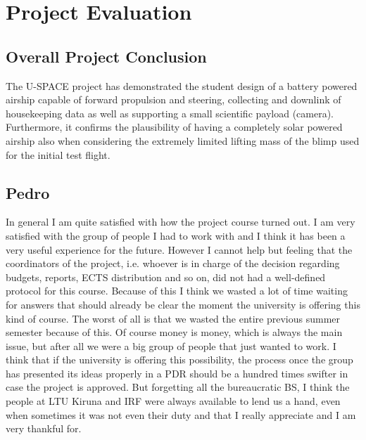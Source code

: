 \newpage
\chapter{Project Evaluation}
\label{chap:evaluation}

\section{Overall Project Conclusion}
%
The U-SPACE project has demonstrated the student design of a battery powered airship capable of forward propulsion and steering, collecting and downlink of housekeeping data as well as supporting a small scientific payload (camera). Furthermore, it confirms the plausibility of having a completely solar powered airship also when considering the extremely limited lifting mass of the blimp used for the initial test flight.
%
%
\section{Pedro}
In general I am quite satisfied with how the project course turned out. I am very satisfied with the group of people I had to work with and I think it has been a very useful experience for the future. 
However I cannot help but feeling that the coordinators of the project, i.e. whoever is in charge of the decision regarding budgets, reports, ECTS distribution and so on, did not had a well-defined protocol for this course. Because of this I think we wasted a lot of time waiting for answers that should already be clear the moment the university is offering this kind of course. The worst of all is that we wasted the entire previous summer semester because of this. Of course money is money, which is always the main issue, but after all we were a big group of people that just wanted to work. I think that if the university is offering this possibility, the process once the group has presented its ideas properly in a PDR should be a hundred times swifter in case the project is approved. 
But forgetting all the bureaucratic BS, I think the people at LTU Kiruna and IRF were always available to lend us a hand, even when sometimes it was not even their duty and that I really appreciate and I am very thankful for.
%
%
